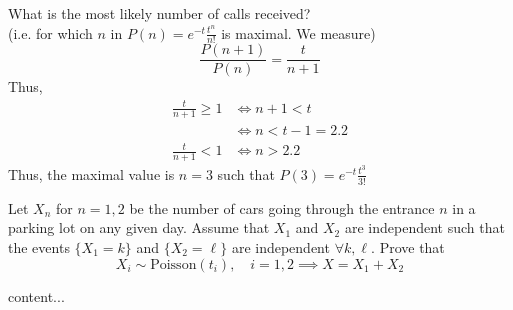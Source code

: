 \documentclass{article}
\begin{document}
		\begin{exmp}
			What is the most likely number of calls received?\\
			(i.e. for which $n$ in $P(n) = e^{-t} \frac{t^n}{n!}$ is maximal. We measure)
			$$ \frac{P(n+1)}{P(n)} = \frac{t}{n+1}$$
			Thus, 
			\begin{align*}
				\frac{t}{n+1} \geq 1 &\iff n+1 < t \\
				&\iff n < t-1 = 2.2 \\
				\frac{t}{n+1} < 1 &\iff n > 2.2 
			\end{align*}
			Thus, the maximal value is $n=3$ such that $P(3)=e^{-t} \frac{t^3}{3!}$
			\begin{figure}[h]
			\end{figure}
		\end{exmp}
		\begin{exe}
			Let $X_n$  for $n=1,2$ be the number of cars going through the entrance $n$ in a parking lot on any given day. Assume that $X_1$ and $X_2$ are independent such that the events $\{X_1 = k\}$ and $\{X_2 = \ell\}$ are independent $\forall k, \ell$. Prove that
			$$ X_i \sim \text{Poisson}(t_i), \quad i =1,2 \implies X = X_1 + X_2$$
		\end{exe}
		\begin{sol}
			content...
		\end{sol}
\end{document}
